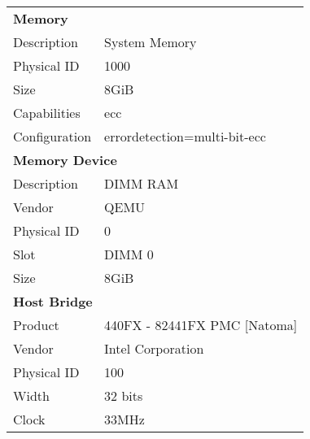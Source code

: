 \documentclass{article}
\begin{document}
\begin{table}[htbp]
\begin{tabular}{ll}
      \midrule
      \multicolumn{2}{l}{\textbf{Memory}} \\
      Description & System Memory \\
      Physical ID & 1000 \\
      Size & 8GiB \\
      Capabilities & ecc \\
      Configuration & errordetection=multi-bit-ecc \\
      \midrule
      \multicolumn{2}{l}{\textbf{Memory Device}} \\
      Description & DIMM RAM \\
      Vendor & QEMU \\
      Physical ID & 0 \\
      Slot & DIMM 0 \\
      Size & 8GiB \\
      \midrule
      \multicolumn{2}{l}{\textbf{Host Bridge}} \\
      Product & 440FX - 82441FX PMC [Natoma] \\
      Vendor & Intel Corporation \\
      Physical ID & 100 \\
      Width & 32 bits \\
      Clock & 33MHz \\
      \midrule
      \bottomrule
    \end{tabular}
  \end{table}
  \newpage
  
\end{document}
